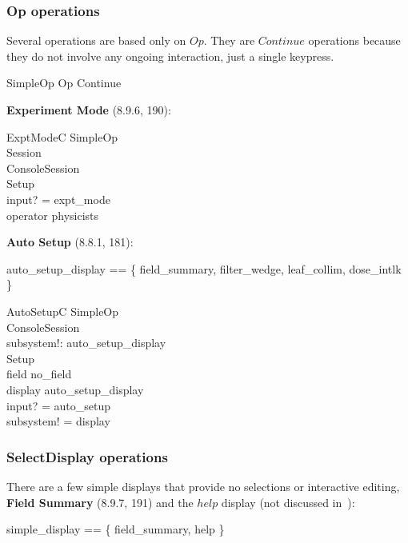\documentclass{article}
\begin{document}
\subsubsection{Op operations}

Several operations are based only on $Op$.  They are $Continue$
operations because they do not involve any ongoing interaction, just a
single keypress.

\begin{zed} SimpleOp  Op \land Continue \end{zed}

{\bf Experiment Mode} (8.9.6, 190):

\begin{schema}{ExptModeC}
	SimpleOp \\
	\Xi Session \\
	\Delta ConsoleSession \\
\where
	Setup \\
	input? = expt\_mode \\
	operator \in physicists \\
\end{schema}
{\bf Auto Setup} (8.8.1, 181):

\begin{zed}
auto\_setup\_display == \{ field\_summary, filter\_wedge, leaf\_collim, dose\_intlk \}
\end{zed}
\begin{schema}{AutoSetupC}
	SimpleOp \\
	\Xi ConsoleSession \\
	subsystem!: auto\_setup\_display \\
\where
	Setup \\
	field \neq no\_field \\
	display \in auto\_setup\_display \\
	input? = auto\_setup \\
	subsystem! = display \\
\end{schema}

\subsubsection{SelectDisplay operations}

There are a few simple displays that provide no selections or
interactive editing, {\bf Field Summary} (8.9.7, 191) and
the $help$ display (not discussed in~\cite{jacky92}):

\begin{zed} simple\_display == \{  field\_summary, help \} \end{zed}
\end{document}
